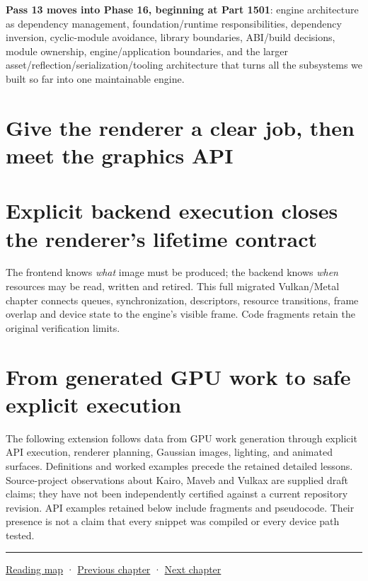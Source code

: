 \textbf{Pass 13 moves into Phase 16, beginning at Part 1501}: engine architecture as dependency management, foundation/runtime responsibilities, dependency inversion, cyclic-module avoidance, library boundaries, ABI/build decisions, module ownership, engine/application boundaries, and the larger asset/reflection/serialization/tooling architecture that turns all the subsystems we built so far into one maintainable engine.

\section{Give the renderer a clear job, then meet the graphics API}\label{05-engine-i-ch018-give-the-renderer-a-clear-job-then-meet-the-graphics-api}

\section{Explicit backend execution closes the renderer's lifetime contract}\label{05-engine-i-ch018-explicit-backend-execution-closes-the-renderers-lifetime-contract}

The frontend knows \emph{what} image must be produced; the backend knows \emph{when} resources may be read, written and retired. This full migrated Vulkan/Metal chapter connects queues, synchronization, descriptors, resource transitions, frame overlap and device state to the engine's visible frame. Code fragments retain the original verification limits.

\section{From generated GPU work to safe explicit execution}\label{05-engine-i-ch018-from-generated-gpu-work-to-safe-explicit-execution}

The following extension follows data from GPU work generation through explicit API execution, renderer planning, Gaussian images, lighting, and animated surfaces. Definitions and worked examples precede the retained detailed lessons. Source-project observations about Kairo, Maveb and Vulkax are supplied draft claims; they have not been independently certified against a current repository revision. API examples retained below include fragments and pseudocode. Their presence is not a claim that every snippet was compiled or every device path tested.

\begin{center}\rule{0.5\linewidth}{0.5pt}\end{center}

\hyperref[volume-reading-map]{Reading map} · \hyperref[05-engine-i-ch017-ecs-performance-through-cache-and-scheduling]{Previous chapter} · \hyperref[05-engine-i-ch019-gpu-work-and-reusable-metal-frames]{Next chapter}
